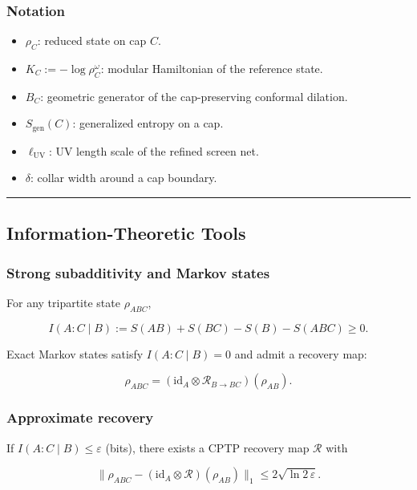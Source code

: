 \subsubsection{Notation}\label{15-notation}

\begin{itemize}
\tightlist
\item
  \(\rho_C\): reduced state on cap \(C\).
\item
  \(K_C := -\log \rho_C^{\omega}\): modular Hamiltonian of the reference state.
\item
  \(B_C\): geometric generator of the cap-preserving conformal dilation.
\item
  \(S_{\mathrm{gen}}(C)\): generalized entropy on a cap.
\item
  \(\ell_{\mathrm{UV}}\): UV length scale of the refined screen net.
\item
  \(\delta\): collar width around a cap boundary.
\end{itemize}

\begin{center}\rule{0.5\linewidth}{0.5pt}\end{center}
\subsection{Information-Theoretic Tools}\label{2-information-theoretic-tools}

\subsubsection{Strong subadditivity and Markov states}\label{21-strong-subadditivity-and-markov-states}

For any tripartite state \(\rho_{ABC}\),

\[
I(A:C \mid B) := S(AB) + S(BC) - S(B) - S(ABC) \ge 0.
\]

Exact Markov states satisfy \(I(A:C \mid B) = 0\) and admit a recovery map:

\[
\rho_{ABC} = (\mathrm{id}_A \otimes \mathcal R_{B\to BC})(\rho_{AB}).
\]

\subsubsection{Approximate recovery}\label{22-approximate-recovery}

If \(I(A:C \mid B) \le \varepsilon\) (bits), there exists a CPTP recovery map \(\mathcal{R}\) with

\[
\| \rho_{ABC} - (\mathrm{id}_A \otimes \mathcal R)(\rho_{AB}) \|_1
\le 2 \sqrt{\ln 2\, \varepsilon}.
\]

